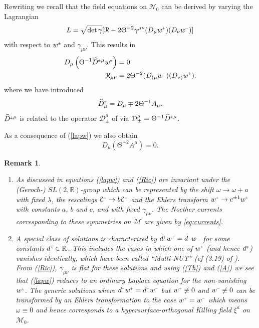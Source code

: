 \documentclass[a4paper,11pt,reqno]{amsart}
\newcommand{\cE}{\mathcal{E}}
\newcommand{\cR}{\mathcal{R}}
\newcommand{\cM}{\mathcal{M}}
\newcommand{\cN}{\mathcal{N}}
\newcommand{\wh}{\widehat}
\theoremstyle{plain}
\newtheorem{remark}[thm]{Remark}
\renewcommand{\P}[1]{{{#1}^{\hspace{-.5pt}\scaleto{+}{4pt}}}}
\newcommand{\M}[1]{{{#1}^{\hspace{-.5pt}\scaleto{-}{4pt}}}}
\newcommand{\PM}[1]{{{#1}^{\hspace{-.5pt}\scaleto{\pm}{3.5pt}}}}
\newcommand{\MP}[1]{{{#1}^{\hspace{-.5pt}\scaleto{\mp}{3.5pt}}}}
\numberwithin{equation}{section}
\begin{document}
Rewriting \cite[Eq. (5.18)]{gibbons:hawking:1979}  we recall that the  field equations on $\cN_0$ 
can be derived by varying the Lagrangian
\begin{equation} \label{Lag}
L = \sqrt{\det \gamma}[\cR-2\Theta^{-2}\gamma^{\mu\nu}(D_{\mu}\P{w})(D_{\nu}\M{w})]
\end{equation}
with respect to $\PM{w}$ and $\gamma_{\mu\nu}$. This results in
\begin{align}
\label{lapw}
D_{\mu}\left( \Theta^{-1} \PM{\wh D}{}^{\mu} \PM{w} \right) ={}&  0 \\
\label{Ric}
\cR_{\mu\nu} ={}& 2\Theta^{-2}(D_{(\mu}\M{w})(D_{\nu)}\P{w}).
\end{align}
where we have introduced
\begin{equation}
\label{dhat}
\PM{\wh D}_{\mu} = D_{\mu} \mp 2\Theta^{-1}A_{\mu}.
\end{equation}
%
 $\PM{\wh D}{}^{\mu}$ is related to the operator $\mathcal{D}^{\mu}_{\pm}$ of \cite{simon:1995}
via $\mathcal {D}^{\mu}_{\pm}  = \Theta^{-1} \PM{\wh D}{}^{\mu}$.
  
 
As a consequence of (\ref{lapw}) we also obtain 
\begin{equation}
D_{\mu}( \Theta^{-2} A^{\mu}) = 0. 
\end{equation}

\begin{remark}~
\begin{enumerate}
\item
As discussed in \cite[Sect. 5]{gibbons:hawking:1979}  equations (\ref{lapw}) and (\ref{Ric}) are invariant  under the (Geroch-) $SL(2,\mathbb{R})$-group \cite{1971JMP....12..918G}  which can be represented by the shift $\omega \rightarrow \omega + a$
with fixed $\lambda$, the rescalings $\PM{\cE} \rightarrow b \PM{\cE}$ and the Ehlers transform 
$\PM{w} \rightarrow c^{\pm 1} \PM{w}$  with constants $a$, $b$ and $c$, and with fixed
$\gamma_{\mu\nu}$.  The Noether currents corresponding to these symmetries on $\cM$ are given by \eqref{eq:currents}.  
%
%
%
\item
A special class of solutions  is characterized by $\P{d} \P{w} = \M{d} \M{w}$  for some 
 constants $\PM{d} \in {\mathbb{R}}$. This includes the cases in which one of $\PM{w}$ (and hence $\MP{d}$) vanishes identically, which have been  called ``Multi-NUT'' (cf (3.19) of \cite{gibbons:hawking:1979}). From (\ref{Ric}), $\gamma_{\mu\nu}$ is flat for these solutions and using (\ref{Th}) and (\ref{A}) we see that (\ref{lapw}) reduces to an ordinary Laplace equation for the non-vanishing $\PM{w}$.  The generic solutions where $\P{d} \P{w} = \M{d} \M{w}$ but $\P{w} \not\equiv 0$ and $\M{w} \not\equiv 0$  
 can be transformed by an Ehlers transformation to the case $ \P{w} = \M{w}$ which means $\omega \equiv 0$ and hence corresponds to a hypersurface-orthogonal Killing field $\xi^{a}$ on $\cM_0$.
%
%
%
\end{enumerate}

\end{remark}
\end{document}

